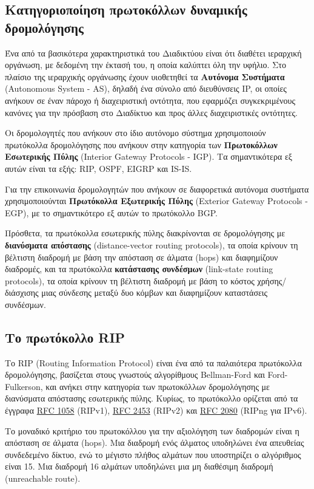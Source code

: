 \documentclass{EdipyLabs} %
\begin{document}
\subsection{Κατηγοριοποίηση πρωτοκόλλων δυναμικής δρομολόγησης}
Ένα από τα βασικότερα χαρακτηριστικά του Διαδικτύου είναι ότι διαθέτει ιεραρχική οργάνωση, με δεδομένη την έκτασή του, η οποία καλύπτει όλη την υφήλιο. Στο πλαίσιο της ιεραρχικής οργάνωσης έχουν υιοθετηθεί τα \textbf{Αυτόνομα Συστήματα} (Autonomous System - AS), δηλαδή ένα σύνολο από διευθύνσεις IP, οι οποίες ανήκουν σε έναν πάροχο ή διαχειριστική οντότητα, που εφαρμόζει συγκεκριμένους κανόνες για την πρόσβαση στο Διαδίκτυο και προς άλλες διαχειριστικές οντότητες.

Οι δρομολογητές που ανήκουν στο ίδιο αυτόνομο σύστημα χρησιμοποιούν πρωτόκολλα δρομολόγησης που ανήκουν στην κατηγορία των \textbf{Πρωτοκόλλων Εσωτερικής Πύλης} (Interior Gateway Protocols - IGP). Τα σημαντικότερα εξ αυτών είναι τα εξής: RIP, OSPF, EIGRP και IS-IS. 

Για την επικοινωνία δρομολογητών που ανήκουν σε διαφορετικά αυτόνομα συστήματα χρησιμοποιούνται \textbf{Πρωτόκολλα Εξωτερικής Πύλης} (Exterior Gateway Protocols - EGP), με το σημαντικότερο εξ αυτών το πρωτόκολλο BGP.

Πρόσθετα, τα πρωτόκολλα εσωτερικής πύλης διακρίνονται σε δρομολόγησης με \textbf{διανύσματα απόστασης} (distance-vector routing protocols), τα οποία κρίνουν τη βέλτιστη διαδρομή με βάση την απόσταση σε άλματα (hops) και διαφημίζουν διαδρομές, και τα πρωτόκολλα \textbf{κατάστασης συνδέσμων} (link-state routing protocols), τα οποία κρίνουν τη βέλτιστη διαδρομή με βάση το κόστος χρήσης/διάσχισης μιας σύνδεσης μεταξύ δυο κόμβων και διαφημίζουν καταστάσεις συνδέσμων.

\subsection{Το πρωτόκολλο RIP}
Το RIP (Routing Information Protocol) είναι ένα από τα παλαιότερα πρωτόκολλα δρομολόγησης, βασίζεται στους γνωστούς αλγορίθμους Bellman-Ford και Ford-Fulkerson, και ανήκει στην κατηγορία των πρωτοκόλλων δρομολόγησης με διανύσματα απόστασης εσωτερικής πύλης. Κυρίως, το πρωτόκολλο ορίζεται από τα έγγραφα \href{https://tools.ietf.org/html/rfc1058}{RFC 1058} (RIPv1), \href{https://tools.ietf.org/html/rfc2453}{RFC 2453} (RIPv2) και \href{https://tools.ietf.org/html/rfc2080}{RFC 2080} (RIPng για IPv6). 

Το μοναδικό κριτήριο του πρωτοκόλλου για την αξιολόγηση των διαδρομών είναι η απόσταση σε άλματα (hops). Μια διαδρομή ενός άλματος υποδηλώνει ένα απευθείας συνδεδεμένο δίκτυο, ενώ το μέγιστο πλήθος αλμάτων που υποστηρίζει ο αλγόριθμος είναι 15. Μια διαδρομή 16 αλμάτων υποδηλώνει μια μη διαθέσιμη διαδρομή (unreachable route). 
\end{document}
